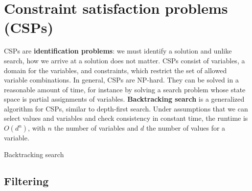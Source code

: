 \documentclass[12pt]{article}
\begin{document}
\section{Constraint satisfaction problems (CSPs)}

CSPs are \textbf{identification problems}: we must identify a solution and unlike search, how we arrive at a solution does not matter. CSPs consist of variables, a domain for the variables, and constraints, which restrict the set of allowed variable combinations. In general, CSPs are NP-hard. They can be solved in a reasonable amount of time, for instance by solving a search problem whose state space is partial assignments of variables. \textbf{Backtracking search} is a generalized algorithm for CSPs, similar to depth-first search. Under assumptions that we can select values and variables and check consistency in constant time, the runtime is $O(d^n)$, with $n$ the number of variables and $d$ the number of values for a variable.

\begin{algorithm}[h]
\caption{Backtracking search}



\end{algorithm}

\subsection{Filtering}
\end{document}
